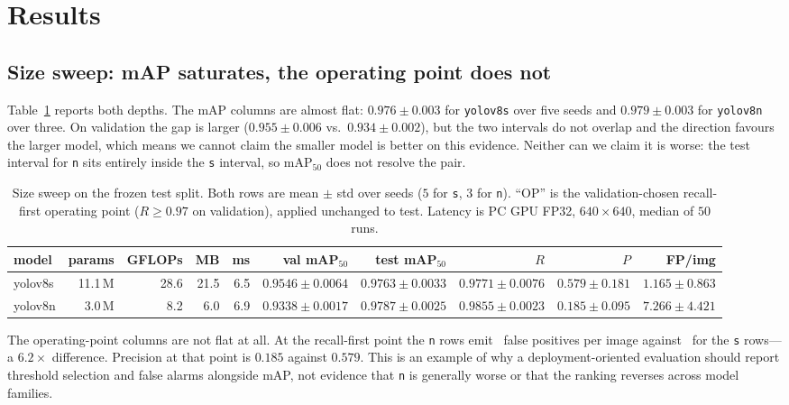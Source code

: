 \section{Results}
\label{sec:results}

\subsection{Size sweep: mAP saturates, the operating point does not}
\label{sec:size}

Table~\ref{tab:size} reports both depths. The mAP columns are almost flat:
$0.976 \pm 0.003$ for \texttt{yolov8s} over five seeds and $0.979 \pm 0.003$ for
\texttt{yolov8n} over three. On validation the gap is larger
($0.955 \pm 0.006$ vs.\ $0.934 \pm 0.002$), but the two intervals do not overlap
and the direction favours the larger model, which means we cannot claim the
smaller model is better on this evidence. Neither can we claim it is worse: the
test interval for \texttt{n} sits entirely inside the \texttt{s} interval, so
mAP$_{50}$ does not resolve the pair.

\begin{table}[t]
\centering
\small
\caption{Size sweep on the frozen test split. Both rows are mean $\pm$ std over
seeds ($5$ for \texttt{s}, $3$ for \texttt{n}). ``OP'' is the validation-chosen
recall-first operating point ($R\ge0.97$ on validation), applied unchanged to
test. Latency is PC GPU FP32, $640\times640$, median of $50$ runs.}
\label{tab:size}
\scriptsize
\setlength{\tabcolsep}{3pt}
\begin{tabular}{lrrrrrrrrr}
\toprule
model & params & GFLOPs & MB & ms & val mAP$_{50}$ & test mAP$_{50}$ & $R$ & $P$ & FP/img \\
\midrule
yolov8s & 11.1\,M & 28.6 & 21.5 & 6.5 & $0.9546\pm0.0064$ & $0.9763\pm0.0033$ & $0.9771\pm0.0076$ & $0.579\pm0.181$ & $1.165\pm0.863$ \\
yolov8n & 3.0\,M & 8.2 & 6.0 & 6.9 & $0.9338\pm0.0017$ & $0.9787\pm0.0025$ & $0.9855\pm0.0023$ & $0.185\pm0.095$ & $7.266\pm4.421$ \\
\bottomrule
\end{tabular}
\end{table}

The operating-point columns are not flat at all. At the recall-first point the
\texttt{n} rows emit \fpn\ false positives per image against \fps\ for the
\texttt{s} rows---a $6.2\times$ difference. Precision at that point is $0.185$
against $0.579$. This is an example of why a deployment-oriented evaluation
should report threshold selection and false alarms alongside mAP, not evidence
that \texttt{n} is generally worse or that the ranking reverses across model
families.

